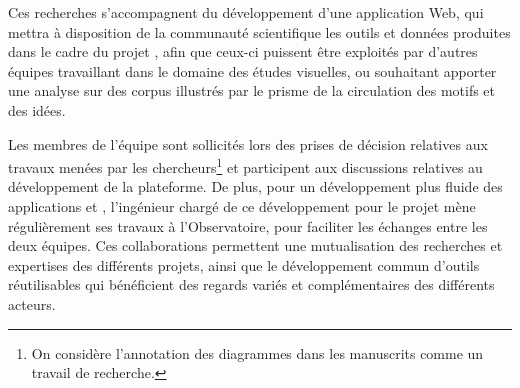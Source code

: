 Ces recherches s'accompagnent du développement d'une application Web, qui mettra à disposition de la communauté scientifique les outils et données produites dans le cadre du projet \vhs, afin que ceux-ci puissent être exploités par d'autres équipes travaillant dans le domaine des études visuelles, ou souhaitant apporter une analyse sur des corpus illustrés par le prisme de la circulation des motifs et des idées. 

 Les membres de l'équipe \imagine sont sollicités lors des prises de décision relatives aux travaux menées par les chercheurs\footnote{On considère l'annotation des diagrammes dans les manuscrits comme un travail de recherche.} et participent aux discussions relatives au développement de la plateforme. De plus, pour un développement plus fluide des applications \vhs et \eida, l'ingénieur chargé de ce développement pour le projet \vhs mène régulièrement ses travaux à l'Observatoire, pour faciliter les échanges entre les deux équipes. Ces collaborations permettent une mutualisation des recherches et expertises des différents projets, ainsi que le développement commun d'outils réutilisables qui bénéficient des regards variés et complémentaires des différents acteurs.